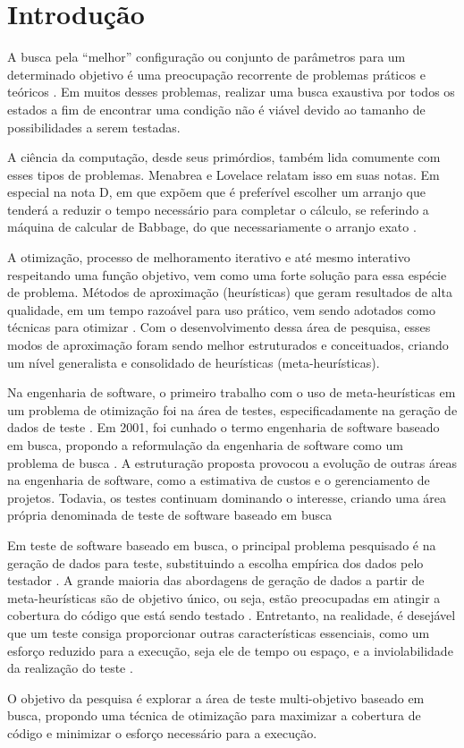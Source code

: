 \chapter[Introdução]{Introdução}

A busca pela ``melhor'' configuração ou conjunto de parâmetros para um
determinado objetivo é uma preocupação recorrente de problemas práticos e
teóricos \cite{combinatorialoptimization1998}. Em muitos desses problemas,
realizar uma busca exaustiva por todos os estados a fim de encontrar uma
condição não é viável devido ao tamanho de possibilidades a serem testadas. 

A ciência da computação, desde seus primórdios, também lida comumente com esses tipos de problemas. Menabrea e Lovelace relatam isso em suas notas. Em especial na nota D, em que expõem que é preferível escolher um arranjo que
tenderá a reduzir o tempo necessário para completar o cálculo, se referindo a
máquina de calcular de Babbage, do que necessariamente o arranjo exato
\cite{menabrea1842sketch}.

A otimização, processo de melhoramento iterativo e até mesmo interativo respeitando uma função objetivo, vem como uma forte solução para essa espécie de problema. Métodos de aproximação (heurísticas) que geram
resultados de alta qualidade, em um tempo razoável para uso prático, vem sendo
adotados como técnicas para otimizar \cite{gendreau2005metaheuristics}. Com o desenvolvimento dessa área de
pesquisa, esses modos de aproximação foram sendo melhor estruturados e
conceituados, criando um nível generalista e consolidado de heurísticas (meta-heurísticas).

Na engenharia de software, o primeiro trabalho com o uso de meta-heurísticas em um problema de 
otimização foi na área de testes, especificadamente na geração de dados de teste \cite{miller1976automatic}. Em 2001, foi cunhado o termo engenharia de software baseado em busca, propondo a reformulação da engenharia de software como um problema de busca \cite{harman2001search}. A estruturação proposta provocou a evolução de outras áreas na engenharia de software, como a estimativa de custos e o gerenciamento de projetos. Todavia, os testes continuam dominando o interesse, criando uma área própria denominada de teste de software baseado em busca \cite{harman2012search}

Em teste de software baseado em busca, o principal problema pesquisado é na geração de dados para teste, substituindo a escolha empírica dos dados pelo testador \cite{mcminn2004search}. A grande maioria das abordagens de geração de dados a partir de meta-heurísticas são de objetivo único, ou seja, estão preocupadas em atingir a cobertura do código que está sendo testado \cite{harman2015achievements}. Entretanto, na realidade, é desejável que um teste consiga proporcionar outras características essenciais, como um esforço reduzido para a execução, seja ele de tempo ou espaço, e a inviolabilidade da realização do teste \cite{harman2015achievements}.

O objetivo da pesquisa é explorar a área de teste multi-objetivo baseado em busca, propondo uma técnica de otimização para maximizar a cobertura de código e minimizar o esforço necessário para a execução. 

 




